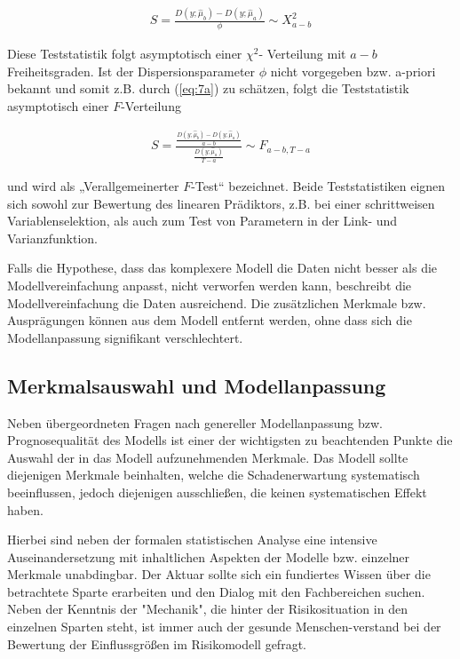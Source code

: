 \begin{eqnarray} 
S = \frac{D(y;\hat{\mu}_b) - D(y;\hat{\mu}_a)}{\phi} \sim X^2_{a-b}
\end{eqnarray}
 
Diese Teststatistik folgt asymptotisch einer $\chi^2$- Verteilung mit $a-b$  Freiheitsgraden. Ist der Dispersionsparameter $\phi$  nicht vorgegeben bzw. a-priori bekannt und somit z.B. durch (\ref{eq:7a})  zu schätzen, folgt die Teststatistik asymptotisch einer $F$-Verteilung

\begin{eqnarray}  \label{eq:12}
S =  \frac  {\frac{D(y;\hat{\mu}_b) - D(y;\hat{\mu}_a)}{a-b}}     {\frac{D(y;\hat{\mu}_a)}{T-a}}       \sim F_{a-b,T-a}
\end{eqnarray}


und wird als „Verallgemeinerter $F$-Test“ bezeichnet. Beide Teststatistiken eignen sich sowohl zur Bewertung des linearen Prädiktors, z.B. bei einer schrittweisen Variablenselektion, als auch zum Test von Parametern in der Link- und Varianzfunktion.

Falls die Hypothese, dass das komplexere Modell die Daten nicht besser als die Modellvereinfachung anpasst, nicht verworfen werden kann, beschreibt die Modellvereinfachung die Daten ausreichend. Die zusätzlichen Merkmale bzw. Ausprägungen können aus dem Modell entfernt werden, ohne dass sich die Modellanpassung signifikant verschlechtert. 














\subsection{Merkmalsauswahl und Modellanpassung}

Neben übergeordneten Fragen nach genereller Modellanpassung bzw. Prognosequalität des Modells ist einer der wichtigsten zu beachtenden Punkte die Auswahl der in das Modell aufzunehmenden Merkmale. Das Modell sollte diejenigen Merkmale beinhalten, welche die Schadenerwartung systematisch beeinflussen, jedoch diejenigen ausschließen, die keinen systematischen Effekt haben. 

Hierbei sind neben der formalen statistischen Analyse eine intensive Auseinandersetzung mit inhaltlichen Aspekten der Modelle bzw. einzelner Merkmale unabdingbar. Der Aktuar sollte sich ein fundiertes Wissen über die betrachtete Sparte erarbeiten und den Dialog mit den Fachbereichen suchen. Neben der Kenntnis der "Mechanik", die hinter der Risikosituation in den einzelnen Sparten steht, ist immer auch der gesunde Menschen-verstand bei der Bewertung der Einflussgrößen im Risikomodell gefragt.

